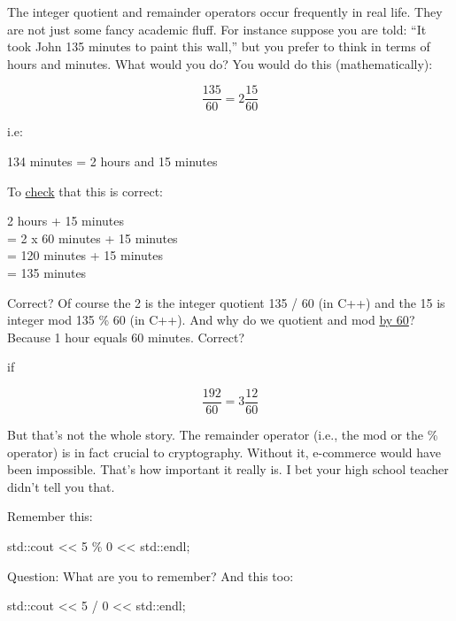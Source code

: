 %

The integer quotient and remainder operators occur frequently in real life.
They are not just some fancy academic fluff. For instance suppose you
are told: “It took John 135 minutes to paint this wall,” but you prefer to
think in terms of hours and minutes. What would you do? You would do
this (mathematically):

\[\frac{135}{60} = 2\frac{15}{60}\]

i.e:

\begin{center}
  134 minutes = 2 hours and 15 minutes
\end{center}

To \underline{check} that this is correct:
\begin{center}
2 hours + 15 minutes\\
= 2 x 60 minutes + 15 minutes\\
= 120 minutes + 15 minutes\\
= 135 minutes
\end{center}

Correct? Of course the 2 is the integer quotient 135 / 60 (in C++) and the
15 is integer mod 135 \% 60 (in C++). And why do we quotient and mod
\underline{by 60}? Because 1 hour equals 60 minutes. Correct?

%

if

\[\frac{192}{60} = 3\frac{12}{60}\]

But that's not the whole story. The remainder operator (i.e., the mod or
the \% operator) is in fact crucial to cryptography. Without it, e-commerce
would have been impossible. That's how important it really is. I bet your
high school teacher didn't tell you that.

%
%
%
%
%
%
%

Remember this:
\begin{console}
std::cout << 5 \% 0 << std::endl;
\end{console}
Question: What are you to remember? And this too:
\begin{console}
std::cout << 5 / 0 << std::endl;
\end{console}


